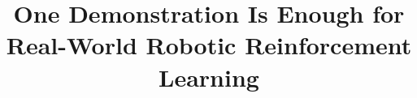 \documentclass[runningheads]{llncs}
\begin{document}
\title{One Demonstration Is Enough for Real-World Robotic Reinforcement Learning} 






\maketitle
\end{document}
